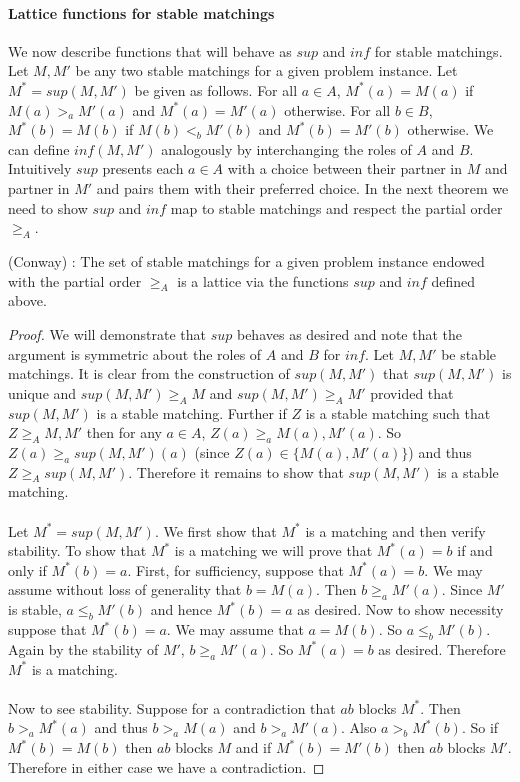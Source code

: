 \paragraph{Lattice functions for stable matchings} We now describe functions that will behave as $sup$ and $inf$ for stable matchings. Let $M, M'$ be any two stable matchings for a given problem instance. Let $M^* = sup(M,M')$ be given as follows. For all $a \in A$, $M^*(a) = M(a)$ if $M(a) >_a M'(a)$ and $M^*(a) = M'(a)$ otherwise. For all $b \in B$, $M^*(b) = M(b)$ if $M(b) <_b M'(b)$ and $M^*(b) = M'(b)$ otherwise. We can define $inf(M,M')$ analogously by interchanging the roles of $A$ and $B$. Intuitively $sup$  presents each $a \in A$ with a choice between their partner in $M$ and partner in $M'$ and pairs them with their preferred choice. In the next theorem we need to show $sup$ and $inf$ map to stable matchings and respect the partial order $\geq_A$.
\begin{theorem}(Conway)\label{theorem:lattice} \cite{knuthmariages}: The set of stable matchings for a given problem instance endowed with the partial order $\geq_A$ is a lattice via the functions $sup$ and $inf$ defined above.
\end{theorem}
\begin{proof}
We will demonstrate that $sup$ behaves as desired and note that the argument is symmetric about the roles of $A$ and $B$ for $inf$. Let $M, M'$ be stable matchings. It is clear from the construction of $sup(M,M')$ that  $sup(M,M')$ is unique and $sup(M,M') \geq_A M$ and $sup(M,M') \geq_A M'$ provided that $sup(M,M')$ is a stable matching. Further if $Z$ is a stable matching such that $Z \geq_A M, M'$ then for any $a \in A$, $Z(a) \geq_a M(a),M'(a)$. So $Z(a) \geq_a sup(M,M')(a)$ (since $Z(a) \in \{M(a), M'(a) \}$) and thus $Z \geq_A sup(M,M')$. Therefore it remains to show that $sup(M,M')$ is a stable matching.
\paragraph{}
Let $M^* = sup(M,M')$. We first show that $M^*$ is a matching and then verify stability. To show that $M^*$ is a matching we will prove that $M^*(a) = b$ if and only if $M^*(b) = a$. First, for sufficiency, suppose that $M^*(a) = b$.  We may assume without loss of generality that $b = M(a)$. Then $b \geq_a M'(a)$. Since $M'$ is stable, $a \leq_b M'(b)$ and hence $M^*(b) = a$ as desired. Now to show necessity suppose that $M^*(b) = a$. We may assume that $a = M(b)$. So $a \leq_b M'(b)$. Again by the stability of $M'$, $b \geq_a M'(a)$. So $M^*(a) = b$ as desired. Therefore $M^*$ is a matching. 
\paragraph{}
Now to see stability. Suppose for a contradiction that $ab$ blocks $M^*$. Then $b >_a M^*(a)$ and thus $b>_a M(a)$ and $b >_a M'(a)$. Also $a >_b M^*(b)$. So if $M^*(b) = M(b)$ then $ab$ blocks $M$ and if $M^*(b) = M'(b)$ then $ab$ blocks $M'$. Therefore in either case we have  a contradiction. \end{proof}
